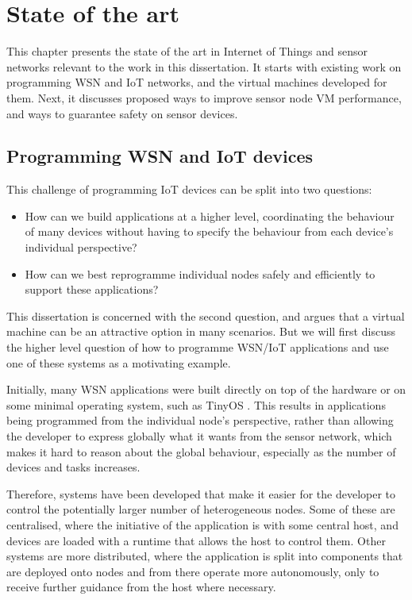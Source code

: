 \chapter{State of the art}
This chapter presents the state of the art in Internet of Things and sensor networks relevant to the work in this dissertation. It starts with existing work on programming WSN and IoT networks, and the virtual machines developed for them. Next, it discusses proposed ways to improve sensor node VM performance, and ways to guarantee safety on sensor devices.

\section{Programming WSN and IoT devices}

This challenge of programming IoT devices can be split into two questions:

\begin{itemize}
    \item How can we build applications at a higher level, coordinating the behaviour of many devices without having to specify the behaviour from each device's individual perspective?
    \item How can we best reprogramme individual nodes safely and efficiently to support these applications?
\end{itemize}

This dissertation is concerned with the second question, and argues that a virtual machine can be an attractive option in many scenarios. But we will first discuss the higher level question of how to programme WSN/IoT applications and use one of these systems as a motivating example.

Initially, many WSN applications were built directly on top of the hardware or on some minimal operating system, such as TinyOS \cite{Levis:2004ws}. This results in applications being programmed from the individual node's perspective, rather than allowing the developer to express globally what it wants from the sensor network, which makes it hard to reason about the global behaviour, especially as the number of devices and tasks increases.

Therefore, systems have been developed that make it easier for the developer to control the potentially larger number of heterogeneous nodes. Some of these are centralised, where the initiative of the application is with some central host, and devices are loaded with a runtime that allows the host to control them. Other systems are more distributed, where the application is split into components that are deployed onto nodes and from there operate more autonomously, only to receive further guidance from the host where necessary.


